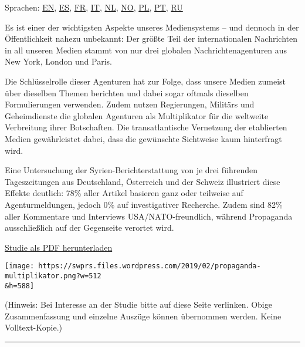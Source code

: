Sprachen: \href{https://swprs.org/the-propaganda-multiplier/}{EN},
\href{https://www.bibliotecapleyades.net/sociopolitica2/sociopol_mediacontrol225.htm}{ES},
\href{https://swprs.org/le-multiplicateur-de-propagande/}{FR},
\href{https://www.bibliotecapleyades.net/sociopolitica2/sociopol_mediacontrol228.htm}{IT},
\href{https://swprs.files.wordpress.com/2019/12/propaganda-multiplier-dutch.pdf}{NL},
\href{https://midtifleisen.wordpress.com/2018/01/04/en-titt-pa-nyhetsbyraenes-rolle/}{NO},
\href{https://wolnemedia.net/powielacze-propagandy/}{PL},
\href{https://revistaopera.com.br/2019/04/23/a-propagacao-hegemonica-como-as-agencias-globais-e-a-midia-ocidental-cobrem-a-geopolitica-parte-1/}{PT},
\href{https://csa.pnzgu.ru/infopswars/ipw1}{RU}

Es ist einer der wichtigsten Aspekte unseres Mediensystems -- und
dennoch in der Öffentlichkeit nahezu unbekannt: Der größte Teil der
internationalen Nachrichten in all unseren Medien stammt von nur drei
globalen Nachrichtenagenturen aus New York, London und Paris.

Die Schlüsselrolle dieser Agenturen hat zur Folge, dass unsere Medien
zumeist über dieselben Themen berichten und dabei sogar oftmals
dieselben Formulierungen verwenden. Zudem nutzen Regierungen, Militärs
und Geheimdienste die globalen Agenturen als Multiplikator für die
weltweite Verbreitung ihrer Botschaften. Die transatlantische Vernetzung
der etablierten Medien gewährleistet dabei, dass die gewünschte
Sichtweise kaum hinterfragt wird.

Eine Untersuchung der Syrien-Berichterstattung von je drei führenden
Tageszeitungen aus Deutschland, Österreich und der Schweiz illustriert
diese Effekte deutlich: 78\% aller Artikel basieren ganz oder teilweise
auf Agenturmeldungen, jedoch 0\% auf investigativer Recherche. Zudem
sind 82\% aller Kommentare und Interviews USA/NATO-freundlich, während
Propaganda ausschließlich auf der Gegenseite verortet wird.

\href{https://swprs.files.wordpress.com/2017/12/der-propaganda-multiplikator-2016-mt.pdf}{Studie
als PDF herunterladen}

\texttt{[image: https://swprs.files.wordpress.com/2019/02/propaganda-multiplikator.png?w=512\\\&h=588]}

(Hinweis: Bei Interesse an der Studie bitte auf diese Seite verlinken.
Obige Zusammen­fassung und einzelne Auszüge können übernommen werden.
Keine Volltext-Kopie.)

\begin{center}\rule{0.5\linewidth}{\linethickness}\end{center}

